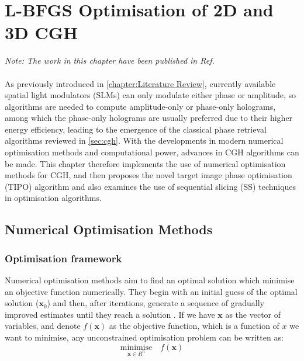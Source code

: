 \chapter{L-BFGS Optimisation of 2D and 3D CGH}
\label{chapter:L-BFGS Optimisation of Phase-Only Hologram}

\graphicspath{{Chapter_Optim_CGH/Figs/}}

\textit{Note: The work in this chapter have been published in Ref. \cite{Sha2022,Sha2023}}\\\\


As previously introduced in \cref{chapter:Literature Review}, currently available spatial light modulators (SLMs) can only modulate either phase or amplitude, so algorithms are needed to compute amplitude-only or phase-only holograms, among which the phase-only holograms are usually preferred due to their higher energy efficiency, leading to the emergence of the classical phase retrieval algorithms reviewed in \cref{sec:cgh}. With the developments in modern numerical optimisation methods and computational power, advances in CGH algorithms can be made. This chapter therefore implements the use of numerical optimisation methods for CGH, and then proposes the novel target image phase optimisation (TIPO) algorithm and also examines the use of sequential slicing (SS) techniques in optimisation algorithms.

\section{Numerical Optimisation Methods} \label{sec:Numerical Optimisation Methods}

\subsection{Optimisation framework} \label{sec:Optimisation framework}
Numerical optimisation methods aim to find an optimal solution which minimise an objective function numerically. They begin with an initial guess of the optimal solution ($\textbf{x}_{0}$) and then, after iterations, generate a sequence of gradually improved estimates until they reach a solution \cite{Nocedal2006}. If we have $\textbf{x}$ as the vector of variables, and denote $f(\textbf{x})$ as the objective function, which is a function of $x$ we want to minimise, any unconstrained optimisation problem can be written as:
\begin{equation}
  \underset{\textbf{x}\in R^n}{\text{minimise}}\quad f(\textbf{x})
  \label{eq:minimise_F}
\end{equation}

